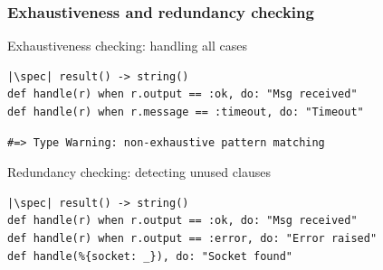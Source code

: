 
\begin{frame}[fragile]
\frametitle{Exhaustiveness and redundancy checking}
\vspace{-7mm}
\begin{block}{\vspace{-5mm}}
\result
\end{block}
\pause

\begin{block}{Exhaustiveness checking: handling all cases}
\begin{verbatim}
|\spec| result() -> string()
def handle(r) when r.output == :ok, do: "Msg received"
def handle(r) when r.message == :timeout, do: "Timeout"
\end{verbatim}
\pause
\vspace{-1.8mm}
\begin{verbatim}
#=> Type Warning: non-exhaustive pattern matching
\end{verbatim}
\end{block}
\pause


\begin{block}{Redundancy checking: detecting unused clauses}
\begin{verbatim}
|\spec| result() -> string()
def handle(r) when r.output == :ok, do: "Msg received"
def handle(r) when r.output == :error, do: "Error raised"
def handle(%{socket: _}), do: "Socket found"
\end{verbatim}
\pause%
\vspace{-1.6mm}\unusedBranch\vspace{-1.7mm}
\end{block}
\end{frame}


